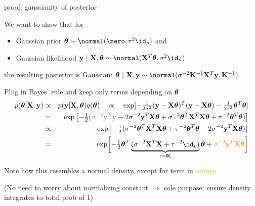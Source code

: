 \documentclass[11pt,compress,t,notes=noshow, xcolor=table]{beamer}
\begin{document}
\begin{framei}[fs=small]{proof: gaussianity of posterior}
\item We want to show that for
\begin{itemize} \small
  \item Gaussian prior $\thetav \sim \normal(\zero, \tau^2 \id_p)$ and 
  \item Gaussian likelihood $\yv ~|~ \Xmat, \thetav \sim \normal(\Xmat^T \thetav, \sigma^2 \id_n)$ 
\end{itemize}
the resulting posterior is Gaussian: $\thetav ~|~ \Xmat, \yv \sim \normal(\sigma^{-2}\Kmat^{-1}\Xmat^T\yv, \Kmat^{-1})$ 
\vfill
\item Plug in Bayes' rule and keep only terms depending on $\bm{\theta}$
\begin{eqnarray*}
p(\thetav | \Xmat, \yv) &\propto& p(\yv | \Xmat, \thetav) q(\thetav) \quad \propto \quad \exp [-\tfrac{1}{2\sigma^2}(\yv - \Xmat\thetav)^T(\yv - \Xmat\thetav)-\tfrac{1}{2\tau^2}\thetav^T\thetav ] \\
&=& \exp \left[ -\tfrac{1}{2} (\textcolor{black!50}{\sigma^{-2}\yv^T\yv} - 2 \sigma^{-2} \yv^T \Xmat \thetav + \sigma^{-2}\thetav^T \Xmat^T \Xmat \thetav  + \tau^{-2} \thetav^T\thetav ) \right] \\
&\propto& \exp \left[ -\tfrac{1}{2} (\sigma^{-2}\thetav^T \Xmat^T \Xmat \thetav  + \tau^{-2} \thetav^T\thetav  - 2 \sigma^{-2} \yv^T \Xmat \thetav ) \right] \\
&=& \exp \biggl[ -\tfrac{1}{2}\thetav^T\underbrace{(\sigma^{-2} \Xmat^T \Xmat + \tau^{-2} \id_p )}_{:= \Kmat} \thetav  +\textcolor{orange}{\sigma^{-2} \yv^T \Xmat \thetav} \biggr] 
\end{eqnarray*}
\item Note how this resembles a normal density, except for term in \textcolor{orange}{orange}
\item (No need to worry about normalizing constant $\Rightarrow$ sole purpose: ensure density integrates to total prob of 1)
\end{framei}
\end{document}
